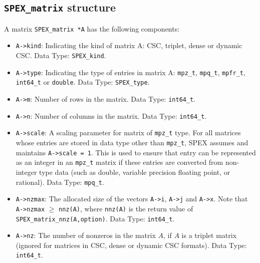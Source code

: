\documentclass[12pt]{report}
\theoremstyle{definition}
\begin{document}
\subsection{\texttt{SPEX\_matrix} structure}

A matrix \verb|SPEX_matrix *A| has the following components:

\begin{itemize}
\item \verb|A->kind|: Indicating the kind of matrix A: CSC, triplet, dense or dynamic CSC.
Data Type: \verb|SPEX_kind|.

\item \verb|A->type|: Indicating the type of entries in matrix A: \verb|mpz_t|,
\verb|mpq_t|, \verb|mpfr_t|, \verb|int64_t| or \verb|double|.
Data Type: \verb|SPEX_type|.

\item \verb|A->m|: Number of rows in the matrix. Data Type: \verb|int64_t|.

\item \verb|A->n|: Number of columns in the matrix. Data Type: \verb|int64_t|.

\item \verb|A->scale|: A scaling parameter for matrix of \verb|mpz_t| type. For
all matrices whose entries are stored in data type other than \verb|mpz_t|, SPEX assumes and maintains
\verb|A->scale = 1|. This is used to ensure that entry can be represented as an
integer in an \verb|mpz_t| matrix if these entries are converted from non-integer type
data (such as double, variable precision floating point, or rational). Data
Type: \verb|mpq_t|.

\item \verb|A->nzmax|: The allocated size of the vectors \verb|A->i|,
\verb|A->j| and \verb|A->x|. Note that \verb|A->nzmax| $\geq$ \verb|nnz(A)|,
where \verb|nnz(A)| is the return value of \verb|SPEX_matrix_nnz(A,option)|.
Data Type: \verb|int64_t|.

\item \verb|A->nz|: The number of nonzeros in the matrix $A$, if $A$ is
a triplet matrix (ignored for matrices in CSC, dense or dynamic CSC formats). Data Type:
\verb|int64_t|.


\end{itemize}
\end{document}
